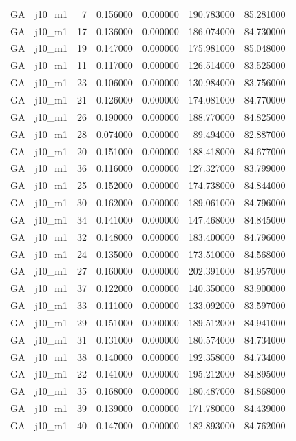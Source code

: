 \begin{tabular}{llrrrrr}
GA & j10_m1 & 7 & 0.156000 & 0.000000 & 190.783000 & 85.281000 \\
GA & j10_m1 & 17 & 0.136000 & 0.000000 & 186.074000 & 84.730000 \\
GA & j10_m1 & 19 & 0.147000 & 0.000000 & 175.981000 & 85.048000 \\
GA & j10_m1 & 11 & 0.117000 & 0.000000 & 126.514000 & 83.525000 \\
GA & j10_m1 & 23 & 0.106000 & 0.000000 & 130.984000 & 83.756000 \\
GA & j10_m1 & 21 & 0.126000 & 0.000000 & 174.081000 & 84.770000 \\
GA & j10_m1 & 26 & 0.190000 & 0.000000 & 188.770000 & 84.825000 \\
GA & j10_m1 & 28 & 0.074000 & 0.000000 & 89.494000 & 82.887000 \\
GA & j10_m1 & 20 & 0.151000 & 0.000000 & 188.418000 & 84.677000 \\
GA & j10_m1 & 36 & 0.116000 & 0.000000 & 127.327000 & 83.799000 \\
GA & j10_m1 & 25 & 0.152000 & 0.000000 & 174.738000 & 84.844000 \\
GA & j10_m1 & 30 & 0.162000 & 0.000000 & 189.061000 & 84.796000 \\
GA & j10_m1 & 34 & 0.141000 & 0.000000 & 147.468000 & 84.845000 \\
GA & j10_m1 & 32 & 0.148000 & 0.000000 & 183.400000 & 84.796000 \\
GA & j10_m1 & 24 & 0.135000 & 0.000000 & 173.510000 & 84.568000 \\
GA & j10_m1 & 27 & 0.160000 & 0.000000 & 202.391000 & 84.957000 \\
GA & j10_m1 & 37 & 0.122000 & 0.000000 & 140.350000 & 83.900000 \\
GA & j10_m1 & 33 & 0.111000 & 0.000000 & 133.092000 & 83.597000 \\
GA & j10_m1 & 29 & 0.151000 & 0.000000 & 189.512000 & 84.941000 \\
GA & j10_m1 & 31 & 0.131000 & 0.000000 & 180.574000 & 84.734000 \\
GA & j10_m1 & 38 & 0.140000 & 0.000000 & 192.358000 & 84.734000 \\
GA & j10_m1 & 22 & 0.141000 & 0.000000 & 195.212000 & 84.895000 \\
GA & j10_m1 & 35 & 0.168000 & 0.000000 & 180.487000 & 84.868000 \\
GA & j10_m1 & 39 & 0.139000 & 0.000000 & 171.780000 & 84.439000 \\
GA & j10_m1 & 40 & 0.147000 & 0.000000 & 182.893000 & 84.762000 \\

\end{tabular}
